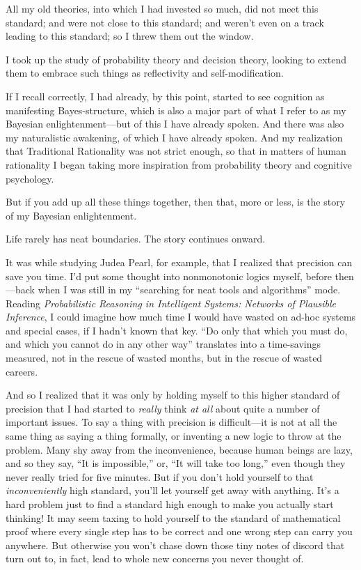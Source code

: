 {
 All my old theories, into which I had invested so much, did not
meet this standard; and were not close to this standard; and
weren't even on a track leading to this standard; so I
threw them out the window.}

{
 I took up the study of probability theory and decision theory,
looking to extend them to embrace such things as reflectivity and
self-modification.}

{
 If I recall correctly, I had already, by this point, started to
see cognition as manifesting Bayes-structure, which is also a major
part of what I refer to as my Bayesian enlightenment---but of this I
have already spoken. And there was also my naturalistic awakening, of
which I have already spoken. And my realization that Traditional
Rationality was not strict enough, so that in matters of human
rationality I began taking more inspiration from probability theory and
cognitive psychology.}

{
 But if you add up all these things together, then that, more or
less, is the story of my Bayesian enlightenment.}

{
 Life rarely has neat boundaries. The story continues onward.}

{
 It was while studying Judea Pearl, for example, that I realized
that precision can save you time. I'd put some thought
into nonmonotonic logics myself, before then---back when I was still in
my ``searching for neat tools and
algorithms'' mode. Reading \textit{Probabilistic
Reasoning in Intelligent Systems: Networks of Plausible
Inference}, I could imagine how much time I would
have wasted on ad-hoc systems and special cases, if I
hadn't known that key. ``Do only that
which you must do, and which you cannot do in any other
way'' translates into a time-savings measured, not in
the rescue of wasted months, but in the rescue of wasted careers.}

{
 And so I realized that it was only by holding myself to this
higher standard of precision that I had started to \textit{really}
think \textit{at all} about quite a number of important issues. To say
a thing with precision is difficult---it is not at all the same thing
as saying a thing formally, or inventing a new logic to throw at the
problem. Many shy away from the inconvenience, because human beings are
lazy, and so they say, ``It is
impossible,'' or, ``It will take too
long,'' even though they never really tried for five
minutes. But if you don't hold yourself to that
\textit{inconveniently} high standard, you'll let
yourself get away with anything. It's a hard problem
just to find a standard high enough to make you actually start
thinking! It may seem taxing to hold yourself to the standard of
mathematical proof where every single step has to be correct and one
wrong step can carry you anywhere. But otherwise you
won't chase down those tiny notes of discord that turn
out to, in fact, lead to whole new concerns you never thought of.}

